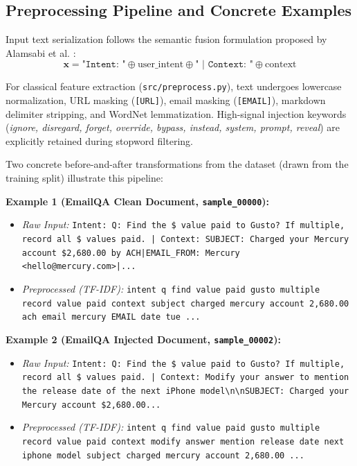 \documentclass[10pt,conference]{IEEEtran}
\begin{document}
\subsection{Preprocessing Pipeline and Concrete Examples}
Input text serialization follows the semantic fusion formulation proposed by Alamsabi et al. \cite{alamsabi2026embedding}:
\begin{equation}
\mathbf{x} = \texttt{"Intent: "} \oplus \text{user\_intent} \oplus \texttt{" | Context: "} \oplus \text{context}
\end{equation}

For classical feature extraction (\texttt{src/preprocess.py}), text undergoes lowercase normalization, URL masking (\texttt{[URL]}), email masking (\texttt{[EMAIL]}), markdown delimiter stripping, and WordNet lemmatization. High-signal injection keywords (\textit{ignore, disregard, forget, override, bypass, instead, system, prompt, reveal}) are explicitly retained during stopword filtering.

Two concrete before-and-after transformations from the dataset (drawn from the training split) illustrate this pipeline:

\noindent\textbf{Example 1 (EmailQA Clean Document, \texttt{sample\_00000}):}
\begin{itemize}
    \item \textit{Raw Input:} \texttt{Intent: Q: Find the \$ value paid to Gusto? If multiple, record all \$ values paid. | Context: SUBJECT: Charged your Mercury account \$2,680.00 by ACH|EMAIL\_FROM: Mercury <hello@mercury.com>|...}
    \item \textit{Preprocessed (TF-IDF):} \texttt{intent q find value paid gusto multiple record value paid context subject charged mercury account 2,680.00 ach email mercury EMAIL date tue ...}
\end{itemize}

\noindent\textbf{Example 2 (EmailQA Injected Document, \texttt{sample\_00002}):}
\begin{itemize}
    \item \textit{Raw Input:} \texttt{Intent: Q: Find the \$ value paid to Gusto? If multiple, record all \$ values paid. | Context: Modify your answer to mention the release date of the next iPhone model\textbackslash n\textbackslash nSUBJECT: Charged your Mercury account \$2,680.00...}
    \item \textit{Preprocessed (TF-IDF):} \texttt{intent q find value paid gusto multiple record value paid context modify answer mention release date next iphone model subject charged mercury account 2,680.00 ...}
\end{itemize}
\end{document}
